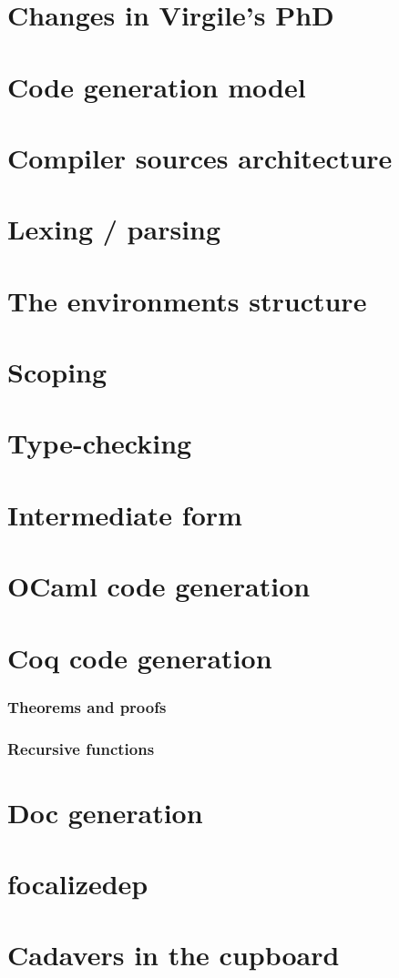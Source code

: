 \documentclass{book}
\begin{document}
\setcounter{tocdepth}{1}
\tableofcontents


\chapter{Changes in Virgile's PhD}


\chapter{Code generation model}


\chapter{Compiler sources architecture}


\chapter{Lexing / parsing}


\chapter{The environments structure}


\chapter{Scoping}


\chapter{Type-checking}


\chapter{Intermediate form}


\chapter{OCaml code generation}

\chapter{Coq code generation}
\subsection{Theorems and proofs}
\subsection{Recursive functions}

\chapter{Doc generation}

\chapter{focalizedep}

\chapter{Cadavers in the cupboard}


\printindex
\end{document}
